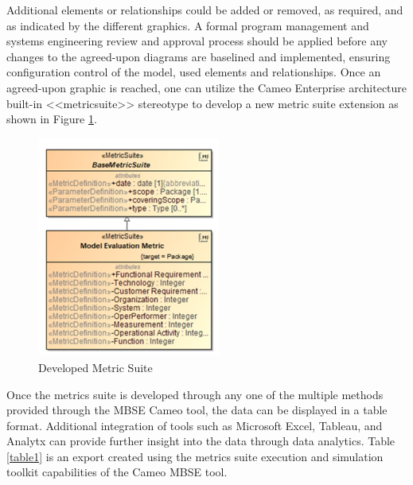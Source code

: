 \documentclass[num-refs]{wiley-article}
\begin{document}
Additional elements or relationships could be added or removed, as required, and as indicated by the different graphics. A formal program management and systems engineering review and approval process should be applied before any changes to the agreed-upon diagrams are baselined and implemented, ensuring configuration control of the model, used elements and relationships. Once an agreed-upon graphic is reached, one can utilize the Cameo Enterprise architecture built-in \textless{}\textless{}metricsuite\textgreater{}\textgreater{} stereotype to develop a new metric suite extension as shown in Figure \ref{fig7}.

\begin{figure}
\centering
\includegraphics[width=6cm]{Images/Picture1.png}
\caption{Developed Metric Suite}
\label{fig7}
\end{figure}

Once the metrics suite is developed through any one of the multiple methods provided through the MBSE Cameo tool, the data can be displayed in a table format. Additional integration of tools such as Microsoft Excel, Tableau, and Analytx can provide further insight into the data through data analytics. Table \ref{table1} is an export created using the metrics suite execution and simulation toolkit capabilities of the Cameo MBSE tool.
\end{document}
